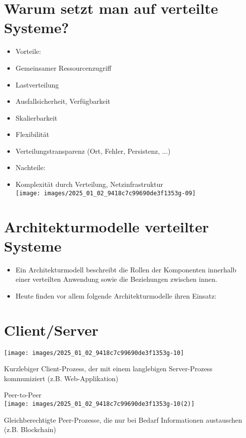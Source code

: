 \documentclass[10pt]{article}
\begin{document}
\section*{Warum setzt man auf verteilte Systeme?}
\begin{itemize}
  \item Vorteile:
  \item Gemeinsamer Ressourcenzugriff
  \item Lastverteilung
  \item Ausfallsicherheit, Verfügbarkeit
  \item Skalierbarkeit
  \item Flexibilität
  \item Verteilungstransparenz (Ort, Fehler, Persistenz, ...)
  \item Nachteile:
  \item Komplexität durch Verteilung, Netzinfrastruktur\\
\texttt{[image: images/2025\_01\_02\_9418c7c99690de3f1353g-09]}
\end{itemize}

\section*{Architekturmodelle verteilter Systeme}
\begin{itemize}
  \item Ein Architekturmodell beschreibt die Rollen der Komponenten innerhalb einer verteilten Anwendung sowie die Beziehungen zwischen innen.
  \item Heute finden vor allem folgende Architekturmodelle ihren Einsatz:
\end{itemize}

\section*{Client/Server}
\begin{center}
\texttt{[image: images/2025\_01\_02\_9418c7c99690de3f1353g-10]}
\end{center}

Kurzlebiger Client-Prozess, der mit einem langlebigen Server-Prozess kommuniziert (z.B. Web-Applikation)

Peer-to-Peer\\
\texttt{[image: images/2025\_01\_02\_9418c7c99690de3f1353g-10(2)]}

Gleichberechtigte Peer-Prozesse, die nur bei Bedarf Informationen austauschen (z.B. Blockchain)
\end{document}
